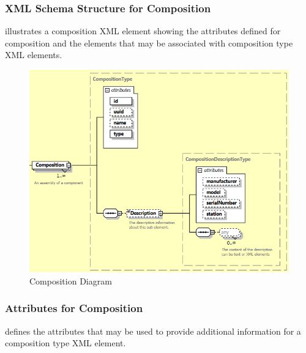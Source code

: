 \documentclass{mtconnect}	%
\begin{document}
\subsubsection{XML Schema Structure for Composition}

 illustrates a \gls{composition} XML element showing the attributes defined for \gls{composition} and the elements that may be associated with \gls{composition} type XML elements.

\begin{figure}[ht]
  \centering
  \includegraphics[width=.75\textwidth]{figures/composition-schema-diagram.png}
  \caption{Composition Diagram}
  \label{fig:composition-schema-diagram}
\end{figure}

\FloatBarrier

\subsubsection{Attributes for Composition}

 defines the attributes that may be used to provide additional information for a \gls{composition} type XML element.
\end{document}
